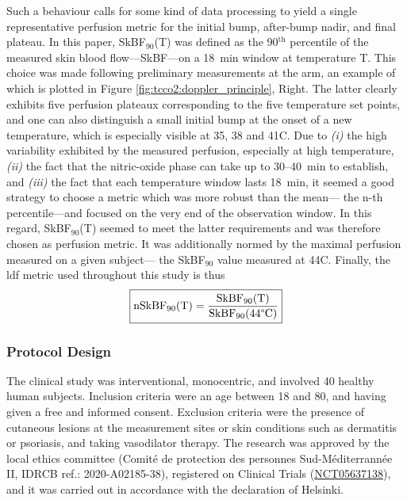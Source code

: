 Such a behaviour calls for some kind of data processing to yield a single representative perfusion metric for the initial bump, after-bump nadir, and final plateau. In this paper, SkBF$_{90}$(T) was defined as the 90$^\text{th}$ percentile of the measured skin blood flow---SkBF---on a 18~min window at temperature T. This choice was made following preliminary measurements at the arm, an example of which is plotted in Figure \ref{fig:tcco2:doppler_principle}, Right. The latter clearly exhibits five perfusion plateaux corresponding to the five temperature set points, and one can also distinguish a small initial bump at the onset of a new temperature, which is especially visible at 35, 38 and 41{\degree}C. Due to \textit{(i)} the high variability exhibited by the measured perfusion, especially at high temperature, \textit{(ii)} the fact that the nitric-oxide phase can take up to 30--40~min to establish\cite{barcroft1943, taylor1984, minson2001, frantz2012, delpozzi2016}, and \textit{(iii)} the fact that each temperature window lasts 18~min, it seemed a good strategy to choose a metric which was more robust than the mean---\eg{} the n-th percentile---and focused on the very end of the observation window. In this regard, SkBF$_{90}$(T) seemed to meet the latter requirements and was therefore chosen as perfusion metric. It was additionally normed by the maximal perfusion measured on a given subject---\ie{} the SkBF$_{90}$ value measured at 44{\degree}C. Finally, the \gls{ldf} metric used throughout this study is thus
\begin{equation}
	\boxed{
		\mathrm{nSkBF_{90}(T)} = \frac{\mathrm{SkBF_{90}(T)}}{\mathrm{SkBF_{90}(44{\degree}C)}}
	}
\end{equation}

\subsubsection{Protocol Design}\label{subsect:tcco2:protocol}

The clinical study was interventional, monocentric, and involved 40 healthy human subjects. Inclusion criteria were an age between 18 and 80, and having given a free and informed consent. Exclusion criteria were the presence of cutaneous lesions at the measurement sites or skin conditions such as dermatitis or psoriasis, and taking vasodilator therapy. The research was approved by the local ethics committee (Comité de protection des personnes Sud-Méditerrannée II, IDRCB ref.: 2020-A02185-38), registered on Clinical Trials (\href{https://web.archive.org/web/20230224073221/https://clinicaltrials.gov/ct2/show/NCT05637138}{NCT05637138}), and it was carried out in accordance with the declaration of Helsinki.

